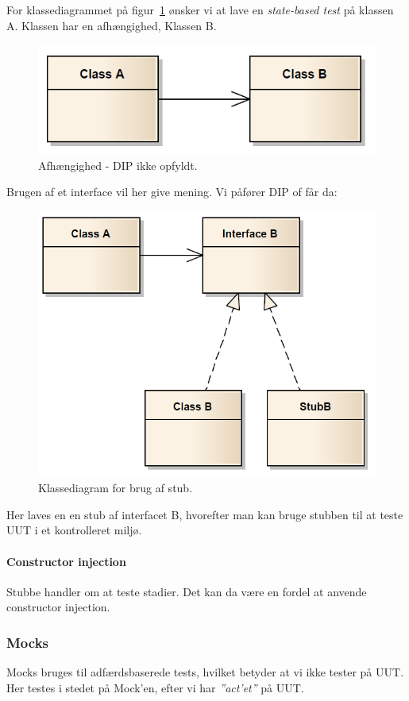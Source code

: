 For klassediagrammet på figur~\ref{fig:stubNoInterface} ønsker vi at lave en \textit{state-based test} på klassen A. Klassen har en afhængighed, Klassen B.

\begin{figure}[H]
	\centering
	\includegraphics[width=0.5\linewidth]{figs/stubNoInterface.PNG}
	\caption{Afhængighed - DIP ikke opfyldt.}
	\label{fig:stubNoInterface}
\end{figure}

Brugen af et interface vil her give mening. Vi påfører DIP of får da:

\begin{figure}[H]
	\centering
	\includegraphics[width=0.55\linewidth]{figs/stubInterface.PNG}
	\caption{Klassediagram for brug af stub.}
	\label{fig:stubInterface}
\end{figure}

Her laves en en stub af interfacet B, hvorefter man kan bruge stubben til at teste UUT i et kontrolleret miljø.

\paragraph{Constructor injection}
Stubbe handler om at teste stadier. Det kan da være en fordel at anvende constructor injection.

\subsubsection{Mocks}
Mocks bruges til adfærdsbaserede tests, hvilket betyder at vi ikke tester på UUT. Her testes i stedet på Mock'en, efter vi har \textit{''act'et''} på UUT.

